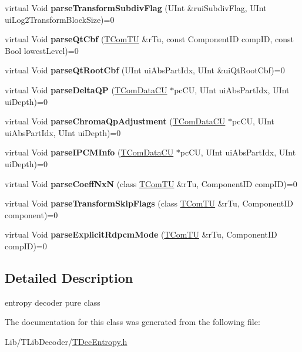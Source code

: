\begin{DoxyCompactItemize}
virtual Void {\bfseries parse\+Transform\+Subdiv\+Flag} (U\+Int \&rui\+Subdiv\+Flag, U\+Int ui\+Log2\+Transform\+Block\+Size)=0
\item 
\mbox{\label{class_t_dec_entropy_if_a1869416a76d0811d0cbf402d327a2cd8}} 
virtual Void {\bfseries parse\+Qt\+Cbf} (\hyperlink{class_t_com_t_u}{T\+Com\+TU} \&r\+Tu, const Component\+ID comp\+ID, const Bool lowest\+Level)=0
\item 
\mbox{\label{class_t_dec_entropy_if_a4f20c0c5cea70deda8c666a80e0c4f7e}} 
virtual Void {\bfseries parse\+Qt\+Root\+Cbf} (U\+Int ui\+Abs\+Part\+Idx, U\+Int \&ui\+Qt\+Root\+Cbf)=0
\item 
\mbox{\label{class_t_dec_entropy_if_a92d35935f23450484676ee225d64d5c8}} 
virtual Void {\bfseries parse\+Delta\+QP} (\hyperlink{class_t_com_data_c_u}{T\+Com\+Data\+CU} $\ast$pc\+CU, U\+Int ui\+Abs\+Part\+Idx, U\+Int ui\+Depth)=0
\item 
\mbox{\label{class_t_dec_entropy_if_a83e25c3f45810cbbc736a01988a6c0f4}} 
virtual Void {\bfseries parse\+Chroma\+Qp\+Adjustment} (\hyperlink{class_t_com_data_c_u}{T\+Com\+Data\+CU} $\ast$pc\+CU, U\+Int ui\+Abs\+Part\+Idx, U\+Int ui\+Depth)=0
\item 
\mbox{\label{class_t_dec_entropy_if_a8409915dba02c504ee282fdb25965798}} 
virtual Void {\bfseries parse\+I\+P\+C\+M\+Info} (\hyperlink{class_t_com_data_c_u}{T\+Com\+Data\+CU} $\ast$pc\+CU, U\+Int ui\+Abs\+Part\+Idx, U\+Int ui\+Depth)=0
\item 
\mbox{\label{class_t_dec_entropy_if_a91fcc26f29c009e13af783e1bf1a6977}} 
virtual Void {\bfseries parse\+Coeff\+NxN} (class \hyperlink{class_t_com_t_u}{T\+Com\+TU} \&r\+Tu, Component\+ID comp\+ID)=0
\item 
\mbox{\label{class_t_dec_entropy_if_aaa3eec78521ad88b29b91b1013846dea}} 
virtual Void {\bfseries parse\+Transform\+Skip\+Flags} (class \hyperlink{class_t_com_t_u}{T\+Com\+TU} \&r\+Tu, Component\+ID component)=0
\item 
\mbox{\label{class_t_dec_entropy_if_a8d5faa4a3a5514d934405535b59e03a0}} 
virtual Void {\bfseries parse\+Explicit\+Rdpcm\+Mode} (\hyperlink{class_t_com_t_u}{T\+Com\+TU} \&r\+Tu, Component\+ID comp\+ID)=0
\end{DoxyCompactItemize}


\subsection{Detailed Description}
entropy decoder pure class 

The documentation for this class was generated from the following file\+:\begin{DoxyCompactItemize}
\item 
Lib/\+T\+Lib\+Decoder/\hyperlink{_t_dec_entropy_8h}{T\+Dec\+Entropy.\+h}\end{DoxyCompactItemize}
